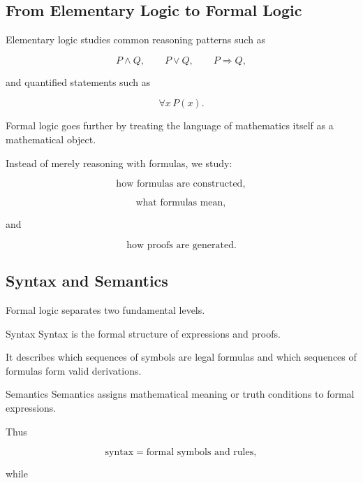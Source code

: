 \subsection{From Elementary Logic to Formal Logic}
\label{subsec:elementary-to-formal-logic}

Elementary logic studies common reasoning patterns such as

\[
P\land Q,
\qquad
P\lor Q,
\qquad
P\Rightarrow Q,
\]

and quantified statements such as

\[
\forall x\,P(x).
\]

Formal logic goes further by treating the language of mathematics itself
as a mathematical object.

Instead of merely reasoning with formulas, we study:

\[
\boxed{
\text{how formulas are constructed},
}
\]

\[
\boxed{
\text{what formulas mean},
}
\]

and

\[
\boxed{
\text{how proofs are generated}.
}
\]

\subsection{Syntax and Semantics}
\label{subsec:syntax-and-semantics}

Formal logic separates two fundamental levels.

\begin{definitionbox}{Syntax}
Syntax is the formal structure of expressions and proofs.

It describes which sequences of symbols are legal formulas and which
sequences of formulas form valid derivations.
\end{definitionbox}

\begin{definitionbox}{Semantics}
Semantics assigns mathematical meaning or truth conditions to formal
expressions.
\end{definitionbox}

Thus

\[
\boxed{
\text{syntax}
=
\text{formal symbols and rules},
}
\]

while

